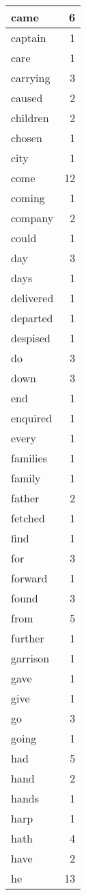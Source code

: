 \begin{center}
\begin{longtable}{l|r}
came & 6 \\ \hline
captain & 1 \\ \hline
care & 1 \\ \hline
carrying & 3 \\ \hline
caused & 2 \\ \hline
children & 2 \\ \hline
chosen & 1 \\ \hline
city & 1 \\ \hline
come & 12 \\ \hline
coming & 1 \\ \hline
company & 2 \\ \hline
could & 1 \\ \hline
day & 3 \\ \hline
days & 1 \\ \hline
delivered & 1 \\ \hline
departed & 1 \\ \hline
despised & 1 \\ \hline
do & 3 \\ \hline
down & 3 \\ \hline
end & 1 \\ \hline
enquired & 1 \\ \hline
every & 1 \\ \hline
families & 1 \\ \hline
family & 1 \\ \hline
father & 2 \\ \hline
fetched & 1 \\ \hline
find & 1 \\ \hline
for & 3 \\ \hline
forward & 1 \\ \hline
found & 3 \\ \hline
from & 5 \\ \hline
further & 1 \\ \hline
garrison & 1 \\ \hline
gave & 1 \\ \hline
give & 1 \\ \hline
go & 3 \\ \hline
going & 1 \\ \hline
had & 5 \\ \hline
hand & 2 \\ \hline
hands & 1 \\ \hline
harp & 1 \\ \hline
hath & 4 \\ \hline
have & 2 \\ \hline
he & 13 \\ \hline

\end{longtable}
\end{center}
